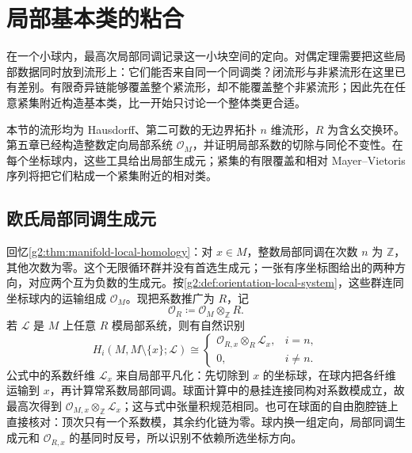 
% 
% 

\section{局部基本类的粘合}
\label{g2:sec:0601}

在一个小球内，最高次局部同调记录这一小块空间的定向。对偶定理需要把这些局部数据同时放到流形上：它们能否来自同一个同调类？闭流形与非紧流形在这里已有差别。有限奇异链能够覆盖整个紧流形，却不能覆盖整个非紧流形；因此先在任意紧集附近构造基本类，比一开始只讨论一个整体类更合适。

\ProseParagraphBreak

本节的流形均为 Hausdorff、第二可数的无边界拓扑 \(n\) 维流形，\(R\) 为含幺交换环。第五章已经构造整数定向局部系统 \(\mathcal O_M\)，并证明局部系数的切除与同伦不变性。在每个坐标球内，这些工具给出局部生成元；紧集的有限覆盖和相对 Mayer--Vietoris 序列将把它们粘成一个紧集附近的相对类。

\subsection{欧氏局部同调生成元}
\label{g2:subsec:0601:01}
回忆\cref{g2:thm:manifold-local-homology}：对 \(x\in M\)，整数局部同调在次数 \(n\) 为 \(\mathbb Z\)，其他次数为零。这个无限循环群并没有首选生成元；一张有序坐标图给出的两种方向，对应两个互为负数的生成元。按\cref{g2:def:orientation-local-system}，这些群连同坐标球内的运输组成 \(\mathcal O_M\)。现把系数推广为 \(R\)，记
\[
	\mathcal O_{R}\coloneqq\mathcal O_M\otimes_{\mathbb Z}R.
\]
若 \(\mathcal L\) 是 \(M\) 上任意 \(R\) 模局部系统，则有自然识别
\begin{equation}\label{g2:eq:local-homology-with-coefficients}
	H_i(M,M\setminus\{x\};\mathcal L)\cong
	\begin{cases}
		\mathcal O_{R,x}\otimes_R\mathcal L_x,&i=n,\\
		0,&i\ne n.
	\end{cases}
\end{equation}
公式中的系数纤维 \(\mathcal L_x\) 来自局部平凡化：先切除到 \(x\) 的坐标球，在球内把各纤维运输到 \(x\)，再计算常系数局部同调。球面计算中的悬挂连接同构对系数模成立，故最高次得到 \(\mathcal O_{M,x}\otimes_{\mathbb Z}\mathcal L_x\)；这与式中张量积规范相同。也可在球面的自由胞腔链上直接核对：顶次只有一个系数模，其余约化链为零。球内换一组定向，局部同调生成元和 \(\mathcal O_{R,x}\) 的基同时反号，所以识别不依赖所选坐标方向。

